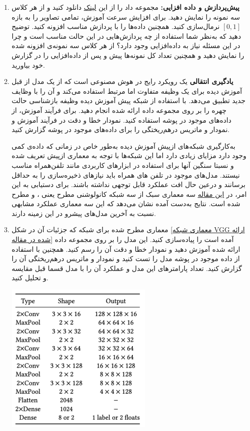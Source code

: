 \begin{enumerate}
	\item \textbf{پیش‌پردازش و داده افزایی: }
	مجموعه داد را از این \href{https://drive.google.com/file/d/1jTou5SjDGMgHkcJ38DrlwvNvZ8YCe2IR/view?usp=sharing}{لینک} دانلود کنید و از هر کلاس سه نمونه را نمایش دهید. برای افزایش سرعت آموزش، تمامی تصاویر را به بازه $[0,1]$ نرمال‌سازی کنید. همچنین داده‌ها را با پردازش مناسب افزونه کنید. توضیح دهید که به‌نظر شما استفاده از چه پردازش‌هایی در این حالت مناسب است و چرا در این مسئله نیاز به داده‌افزایی وجود دارد؟ از هر کلاس سه نمونه‌ی افزونه شده را نمایش دهید و همچنین تعداد کل نمونه‌ها پیش و پس از داده‌افزایی را در گزارش خود بیاورید.
	
	
	\item \textbf{یادگیری انتقالی }
	یک رویکرد رایج در هوش مصنوعی است که از یک مدل از قبل آموزش دیده برای یک وظیفه متفاوت اما مرتبط استفاده می‌کند و آن را با وظایف جدید تطبیق می‌دهد. با استفاده از شبکه پیش آموزش دیده  وظیفه بازشناسی حالت چهره را بر روی مجموعه داده ارائه شده انجام دهید. برای فرآیند آموزش، از داده‌های موجود در پوشه  استفاده کنید. نمودار خطا و دقت در فرآیند آموزش و نمودار  و ماتریس درهم‌ریختگی را برای داده‌های موجود در پوشه  گزارش کنید.
	
	به‌کارگیری شبکه‌های ازپیش آموزش دیده به‌طور خاص در زمانی که داده‌ی کمی وجود دارد مزایای زیادی دارد اما این شبکه‌ها با توجه به معماری از‌پیش تعریف شده و نسبتا سنگین آنها برای استفاده در ابزار‌های کاربردی مانند تلفن‌همراه مناسب نیستند. مدل‌های موجود در تلفن های همراه باید نیاز‌های ذخیره‌سازی را به حداقل برسانند و درعین حال افت عملکرد قابل توجهی نداشته باشند. برای دستیابی به این امر، در \href{https://arxiv.org/pdf/1807.08775.pdf}{این مقاله} سه معماری سبک از سه شبکه کانولوشنی مطرح یعنی ،  و  مطرح شده است. نتایج به‌دست آمده نشان می‌دهد که این سه معماری عملکرد مشابهی نسبت به آخرین مدل‌های پیشرو در این زمینه دارند.
	
	
	\item معماری مطرح شده برای شبکه  که جزئیات آن در شکل \ref{معماری شبکه VGG ارائه شده در مقاله} آمده است را پیاده‌سازی کنید. این مدل را بر روی مجموعه داده ارائه شده آموزش دهید و نمودار خطا و دقت آن را رسم کنید. همچنین با استفاده از داده موجود در پوشه  مدل را تست کنید و نمودار  و ماتریس درهم‌ریختگی آن را گزارش کنید. تعداد پارامتر‌های این مدل و عملکرد آن را با مدل قسما قبل مقایسه و تحلیل کنید.

	
	\begin{center}
		\includegraphics*[width=0.4\linewidth]{pics/img3.png}
		\label{معماری شبکه VGG ارائه شده در مقاله}
	\end{center}
	

\end{enumerate}
